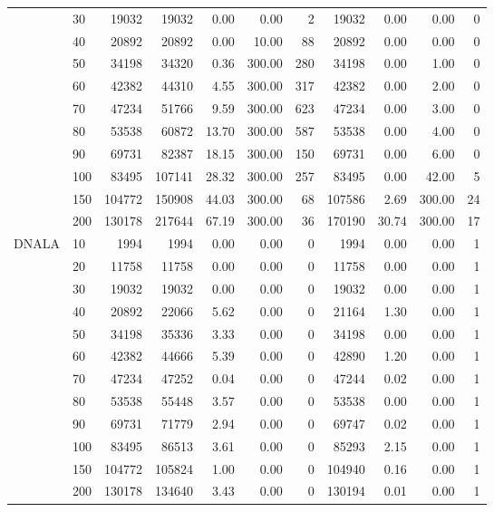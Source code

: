 \documentclass[12pt]{article}
\begin{document}
\begin{table}
{\begin{tabular}{llr|rrrr|rrrr}
   & 30  &    19032 &    19032 &   0.00 &   0.00 &          2 &    19032 &  0.00 &   0.00 &          0 \\
   & 40  &    20892 &    20892 &   0.00 &  10.00 &         88 &    20892 &  0.00 &   0.00 &          0 \\
   & 50  &    34198 &    34320 &   0.36 & 300.00 &        280 &    34198 &  0.00 &   1.00 &          0 \\
   & 60  &    42382 &    44310 &   4.55 & 300.00 &        317 &    42382 &  0.00 &   2.00 &          0 \\
   & 70  &    47234 &    51766 &   9.59 & 300.00 &        623 &    47234 &  0.00 &   3.00 &          0 \\
   & 80  &    53538 &    60872 &  13.70 & 300.00 &        587 &    53538 &  0.00 &   4.00 &          0 \\
   & 90  &    69731 &    82387 &  18.15 & 300.00 &        150 &    69731 &  0.00 &   6.00 &          0 \\
   & 100 &    83495 &   107141 &  28.32 & 300.00 &        257 &    83495 &  0.00 &  42.00 &          5 \\
   & 150 &   104772 &   150908 &  44.03 & 300.00 &         68 &   107586 &  2.69 & 300.00 &         24 \\
   & 200 &   130178 &   217644 &  67.19 & 300.00 &         36 &   170190 & 30.74 & 300.00 &         17 \\
   \midrule
DNALA & 10  &     1994 &     1994 &   0.00 &   0.00 &          0 &     1994 &  0.00 &   0.00 &          1 \\
   & 20  &    11758 &    11758 &   0.00 &   0.00 &          0 &    11758 &  0.00 &   0.00 &          1 \\
   & 30  &    19032 &    19032 &   0.00 &   0.00 &          0 &    19032 &  0.00 &   0.00 &          1 \\
   & 40  &    20892 &    22066 &   5.62 &   0.00 &          0 &    21164 &  1.30 &   0.00 &          1 \\
   & 50  &    34198 &    35336 &   3.33 &   0.00 &          0 &    34198 &  0.00 &   0.00 &          1 \\
   & 60  &    42382 &    44666 &   5.39 &   0.00 &          0 &    42890 &  1.20 &   0.00 &          1 \\
   & 70  &    47234 &    47252 &   0.04 &   0.00 &          0 &    47244 &  0.02 &   0.00 &          1 \\
   & 80  &    53538 &    55448 &   3.57 &   0.00 &          0 &    53538 &  0.00 &   0.00 &          1 \\
   & 90  &    69731 &    71779 &   2.94 &   0.00 &          0 &    69747 &  0.02 &   0.00 &          1 \\
   & 100 &    83495 &    86513 &   3.61 &   0.00 &          0 &    85293 &  2.15 &   0.00 &          1 \\
   & 150 &   104772 &   105824 &   1.00 &   0.00 &          0 &   104940 &  0.16 &   0.00 &          1 \\
   & 200 &   130178 &   134640 &   3.43 &   0.00 &          0 &   130194 &  0.01 &   0.00 &          1 \\


\end{tabular}}
\end{table}
\end{document}
